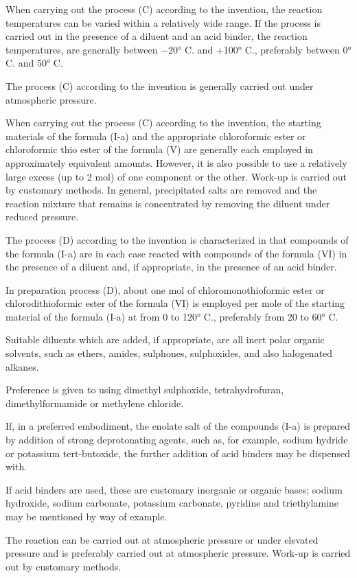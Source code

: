 \documentclass[11pt,a4paper]{article}
\begin{document}
When carrying out the process (C) according to the invention, the reaction temperatures can be varied within a relatively wide range. If the process is carried out in the presence of a diluent and an acid binder, the reaction temperatures, are generally between −20° C. and +100° C., preferably between 0° C. and 50° C.

The process (C) according to the invention is generally carried out under atmospheric pressure.

When carrying out the process (C) according to the invention, the starting materials of the formula (I-a) and the appropriate chloroformic ester or chloroformic thio ester of the formula (V) are generally each employed in approximately equivalent amounts. However, it is also possible to use a relatively large excess (up to 2 mol) of one component or the other. Work-up is carried out by customary methods. In general, precipitated salts are removed and the reaction mixture that remains is concentrated by removing the diluent under reduced pressure.

The process (D) according to the invention is characterized in that compounds of the formula (I-a) are in each case reacted with compounds of the formula (VI) in the presence of a diluent and, if appropriate, in the presence of an acid binder.

In preparation process (D), about one mol of chloromonothioformic ester or chlorodithioformic ester of the formula (VI) is employed per mole of the starting material of the formula (I-a) at from 0 to 120° C., preferably from 20 to 60° C.

Suitable diluents which are added, if appropriate, are all inert polar organic solvents, such as ethers, amides, sulphones, sulphoxides, and also halogenated alkanes.

Preference is given to using dimethyl sulphoxide, tetrahydrofuran, dimethylformamide or methylene chloride.

If, in a preferred embodiment, the enolate salt of the compounds (I-a) is prepared by addition of strong deprotonating agents, such as, for example, sodium hydride or potassium tert-butoxide, the further addition of acid binders may be dispensed with.

If acid binders are used, these are customary inorganic or organic bases; sodium hydroxide, sodium carbonate, potassium carbonate, pyridine and triethylamine may be mentioned by way of example.

The reaction can be carried out at atmospheric pressure or under elevated pressure and is preferably carried out at atmospheric pressure. Work-up is carried out by customary methods.
\end{document}
